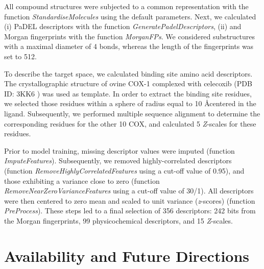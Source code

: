 \documentclass[twoside,a4wide,10pt]{article}
\begin{document}
All compound structures were subjected to a common representation with the 
function {\it StandardiseMolecules} using the default parameters.
Next, we calculated 
(i) PaDEL descriptors \citep{padel} with the function {\it GeneratePadelDescriptors},
(ii) and Morgan fingerprints with the function {\it MorganFPs}.
We considered substructures with a maximal diameter of 4 bonds,
whereas the length of the fingerprints was set to 512.

To describe the target space, we calculated binding site amino acid descriptors.
The crystallographic structure of ovine COX-1 complexed with celecoxib (PDB ID: 3KK6 \citep{pdb_cox}) 
was used as template.
In order to extract the binding site residues, 
we selected those residues within a sphere of radius equal to 10 \AA centered in the ligand.
Subsequently, we performed multiple sequence alignment to determine the corresponding 
residues for the other 10 COX,
and calculated 5 {\it Z}-scales for these residues. 

Prior to model training, missing descriptor values were imputed (function {\it ImputeFeatures}).
Subsequently, we removed highly-correlated descriptors (function {\it RemoveHighlyCorrelatedFeatures} using a cut-off value of 0.95),
and those exhibiting a variance close to zero (function {\it RemoveNearZeroVarianceFeatures} using a cut-off value of 30/1).
All descriptors were then centered to zero mean and scaled to unit variance ({\it z}-scores) (function {\it PreProcess}).
These steps led to a final selection of 356 descriptors: 242 bits from the Morgan fingerprints, 
99 physicochemical descriptors, and 15 {\it Z}-scales.





\section*{Availability and Future Directions}
\end{document}
